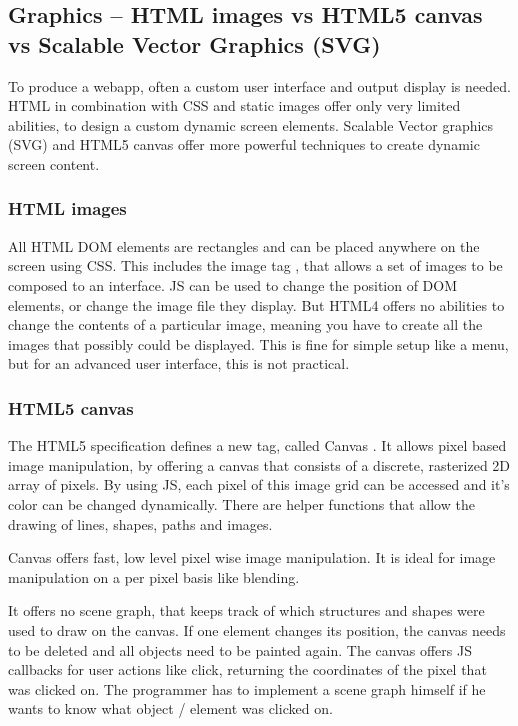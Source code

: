 \subsection{Graphics -- HTML images vs HTML5 canvas vs Scalable Vector Graphics (SVG)}
\label{sec:graphics}

To produce a webapp, often a custom user interface and output display is needed.
HTML in combination with CSS and static images offer only very limited abilities, to design a custom dynamic screen elements.
Scalable Vector graphics (SVG) and HTML5 canvas offer more powerful techniques to create dynamic screen content.


\subsubsection{HTML images}
\label{sec:htmlimg}

All HTML DOM elements are rectangles and can be placed anywhere on the screen using CSS.
This includes the image tag , that allows a set of images to be composed to an interface.
JS can be used to change the position of DOM elements, or change the image file they display.
But HTML4 offers no abilities to change the contents of a particular image, meaning you have to create all the images that possibly could be displayed.
This is fine for simple setup like a menu, but for an advanced user interface, this is not practical.


\subsubsection{HTML5 canvas}
\label{sec:canvas}

The HTML5 specification defines a new tag, called Canvas .
It allows pixel based image manipulation, by offering a canvas that consists of a discrete, rasterized 2D array of pixels.
By using JS, each pixel of this image grid can be accessed and it's color can be changed dynamically.
There are helper functions that allow the drawing of lines, shapes, paths and images.

Canvas offers fast, low level pixel wise image manipulation.
It is ideal for image manipulation on a per pixel basis like blending.

It offers no scene graph, that keeps track of which structures and shapes were used to draw on the canvas.
If one element changes its position, the canvas needs to be deleted and all objects need to be painted again.
The canvas offers JS callbacks for user actions like click, returning the coordinates of the pixel that was clicked on.
The programmer has to implement a scene graph himself if he wants to know what object / element was clicked on.


